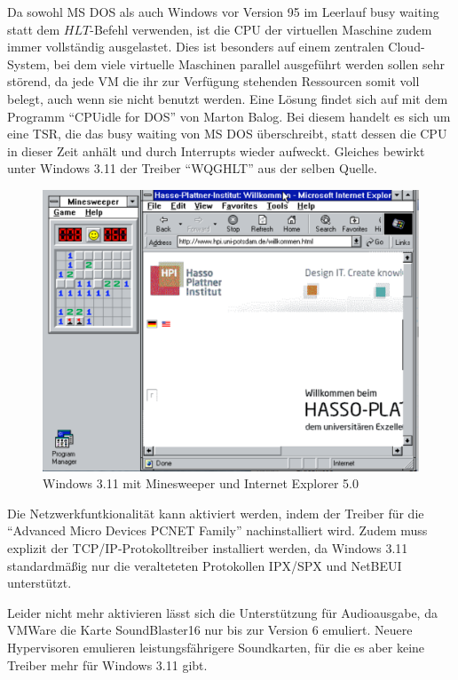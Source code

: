 	Da sowohl MS DOS als auch Windows vor Version 95 im Leerlauf busy waiting statt dem $HLT$-Befehl verwenden, ist die CPU der virtuellen Maschine zudem immer vollständig ausgelastet.
	Dies ist besonders auf einem zentralen Cloud-System, bei dem viele virtuelle Maschinen parallel ausgeführt werden sollen sehr störend, da jede VM die ihr zur Verfügung stehenden Ressourcen somit voll belegt, auch wenn sie nicht benutzt werden.
	Eine Lösung findet sich auf \cite{VMDriver} mit dem Programm "`CPUidle for DOS"' von Marton Balog.
	Bei diesem handelt es sich um eine TSR, die das busy waiting von MS DOS überschreibt, statt dessen die CPU in dieser Zeit anhält und durch Interrupts wieder aufweckt.
	Gleiches bewirkt unter Windows 3.11 der Treiber "`WQGHLT"' aus der selben Quelle.

	\begin{figure}[h]
		\begin{center}
			\includegraphics[width=\textwidth]{img/win311screen}
			\caption{Windows 3.11 mit Minesweeper und Internet Explorer 5.0}
			\label{fig:screenshot-win311apps}
		\end{center}
	\end{figure}

	Die Netzwerkfuntkionalität kann aktiviert werden, indem der Treiber für die "`Advanced Micro Devices PCNET Family"' nachinstalliert wird.
	Zudem muss explizit der TCP/IP-Protokolltreiber installiert werden, da Windows 3.11 standardmäßig nur die veralteteten Protokollen IPX/SPX und NetBEUI unterstützt.

	Leider nicht mehr aktivieren lässt sich die Unterstützung für Audioausgabe, da VMWare die Karte SoundBlaster16 nur bis zur Version 6 emuliert.
	Neuere Hypervisoren emulieren leistungsfährigere Soundkarten, für die es aber keine Treiber mehr für Windows 3.11 gibt.


